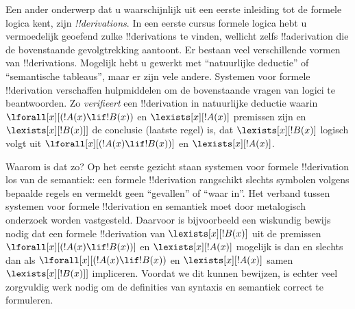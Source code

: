 \documentclass[openany]{memoir}
\begin{document}
Een ander onderwerp dat u waarschijnlijk uit een eerste inleiding tot
de formele logica kent, zijn \emph{!!{derivation}s}. In een eerste cursus
formele logica hebt u vermoedelijk geoefend zulke !!{derivation}s te
vinden, wellicht zelfs !!a{derivation} die de bovenstaande
gevolgtrekking aantoont. Er bestaan veel verschillende vormen van
!!{derivation}s. Mogelijk hebt u gewerkt met ``natuurlijke deductie'' of
``semantische tableaus'', maar er zijn vele andere. Systemen voor formele
!!{derivation} verschaffen hulpmiddelen om de bovenstaande vragen van logici
te beantwoorden. Zo \emph{verifieert} een !!{derivation} in natuurlijke
deductie waarin $\lforall[x][(!A(x) \lif !B(x))$ en
$\lexists[x][!A(x)]$ premissen zijn en $\lexists[x][!B(x)]]$ de conclusie
(laatste regel) is, dat $\lexists[x][!B(x)]$ logisch volgt uit
$\lforall[x][(!A(x) \lif !B(x))]$ en $\lexists[x][!A(x)]$.

Waarom is dat zo? Op het eerste gezicht staan systemen voor formele !!{derivation}
los van de semantiek: een formele !!{derivation} rangschikt slechts
symbolen volgens bepaalde regels en vermeldt geen ``gevallen'' of ``waar
in''. Het verband tussen systemen voor formele !!{derivation} en semantiek moet door
metalogisch onderzoek worden vastgesteld. Daarvoor is bijvoorbeeld een
wiskundig bewijs nodig dat een formele !!{derivation} van
$\lexists[x][!B(x)]$ uit de premissen
$\lforall[x][(!A(x) \lif !B(x))]$ en $\lexists[x][!A(x)]$ mogelijk is dan
en slechts dan als $\lforall[x][(!A(x) \lif !B(x))$ en
$\lexists[x][!A(x)]$ samen $\lexists[x][!B(x)]]$ impliceren. Voordat we
dit kunnen bewijzen, is echter veel zorgvuldig werk nodig om de
definities van syntaxis en semantiek correct te formuleren.
\endgroup

\begingroup
\def\olfilename{OLP-0141}
\def\olfilepath{content/first-order-logic/introduction/}
\hypertarget{unit-OLP-0141}{}




\end{document}
